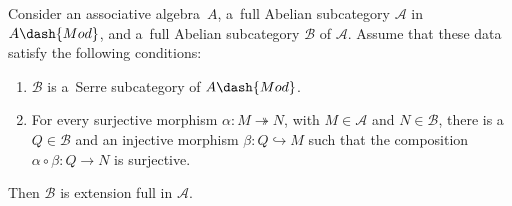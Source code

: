 \documentclass[pdftex]{sigma}
\begin{document}
\begin{proposition}
\label{NewProp}
Consider an associative algebra~$A$, a~full Abelian subcategory $\mathcal{A}$ in $A\dash{Mod}$, and a~full Abelian
subcategory $\mathcal{B}$ of $\mathcal{A}$.
Assume that these data satisfy the following conditions:
\begin{enumerate}[$($a$)$]\itemsep=0pt
\item
$\mathcal{B}$ is a~Serre subcategory of $A\dash{Mod}$.
\item
For every surjective morphism $\alpha: M\twoheadrightarrow N$, with $M\in \mathcal{A}$ and $N\in \mathcal{B}$, there is
a~$Q\in \mathcal{B}$ and an injective morphism $\beta: Q\hookrightarrow M$ such that the composition
$\alpha\circ\beta:Q\to N$ is surjective.
\end{enumerate}
Then $\mathcal{B}$ is extension full in $\mathcal{A}$.
\end{proposition}
\end{document}
